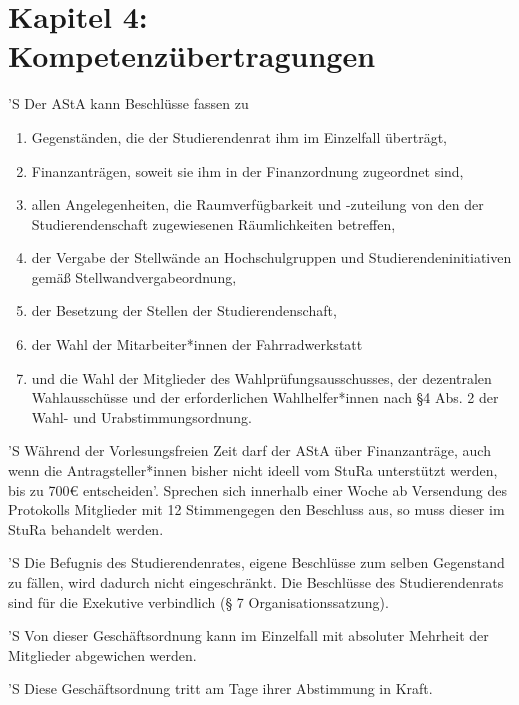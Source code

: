 \documentclass[fontsize=12pt,parskip=half, ref=short]{scrartcl}
\begin{document}
\section*{Kapitel 4: Kompetenzübertragungen}

\begin{contract}

  \label{Par:Kompüb}
  'S Der AStA kann Beschlüsse fassen zu
  \begin{enumerate}
  \item Gegenständen, die der Studierendenrat ihm im Einzelfall überträgt,
  \item Finanzanträgen, soweit sie ihm in der Finanzordnung zugeordnet sind,
  \item allen Angelegenheiten, die Raumverfügbarkeit und -zuteilung von den
    der Studierendenschaft zugewiesenen Räumlichkeiten betreffen,
  \item der Vergabe der Stellwände an Hochschulgruppen und
    Studierendeninitiativen gemäß Stellwandvergabeordnung,
  \item der Besetzung der Stellen der Studierendenschaft,
  \item der Wahl der Mitarbeiter*innen der Fahrradwerkstatt
  \item und die Wahl der Mitglieder des Wahlprüfungsausschusses, der dezentralen
    Wahlausschüsse und der erforderlichen Wahlhelfer*innen nach §4 Abs. 2 der
    Wahl- und Urabstimmungsordnung.
  \end{enumerate}

  'S Während der Vorlesungsfreien Zeit darf der AStA über Finanzanträge, auch
  wenn die Antragsteller*innen bisher nicht ideell vom StuRa unterstützt werden,
  bis zu 700€ entscheiden'. Sprechen sich innerhalb einer Woche ab Versendung
  des Protokolls Mitglieder mit 12 Stimmengegen den Beschluss aus, so muss
  dieser im StuRa behandelt werden.

  'S Die Befugnis des Studierendenrates, eigene Beschlüsse zum selben Gegenstand
  zu fällen, wird dadurch nicht eingeschränkt. Die Beschlüsse des
  Studierendenrats sind für die Exekutive verbindlich (§ 7
  Organisationssatzung).

\end{contract}


\begin{contract}

  \label{Abwe}
  'S Von dieser Geschäftsordnung kann im Einzelfall mit absoluter Mehrheit der
  Mitglieder abgewichen werden.

  'S Diese Geschäftsordnung tritt am Tage ihrer Abstimmung in Kraft.

\end{contract}
\end{document}
